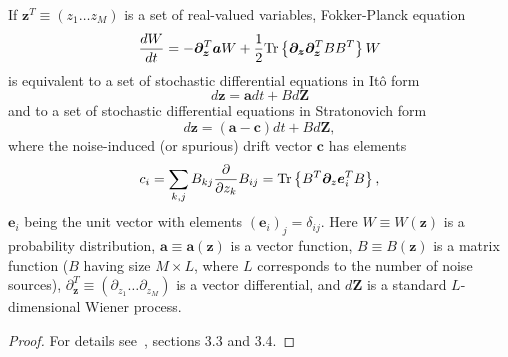 \begin{lemma}
\label{lmm:wigner-bec:fpe:fpe-sde-correspondence}
If $\bm{z}^T \equiv (z_1 \ldots z_M)$ is a set of real-valued variables,
Fokker-Planck equation
\[
	\frac{dW}{dt}
	= -\bm{\partial}_{\bm{z}}^T \bm{a} W
	+ \frac{1}{2} \mathrm{Tr} \left\{  \bm{\partial}_{\bm{z}} \bm{\partial}_{\bm{z}}^T B B^T  \right\} W
\]
is equivalent to a set of stochastic differential equations in It\^{o} form
\[
	d\bm{z} = \bm{a} dt + B d\bm{Z}
\]
and to a set of stochastic differential equations in Stratonovich form
\[
	d\bm{z} = (\bm{a} - \bm{c})dt + B d\bm{Z},
\]
where the noise-induced (or spurious) drift vector $\bm{c}$ has elements
\[
	c_i
	= \sum_{k,j} B_{kj} \frac{\partial}{\partial z_k} B_{ij}
	= \mathrm{Tr} \left\{ B^T \bm{\partial}_z \bm{e}_i^T B \right\},
\]
$\bm{e}_i$ being the unit vector with elements $(\bm{e}_i)_j = \delta_{ij}$.
Here $W \equiv W(\bm{z})$ is a probability distribution,
$\bm{a} \equiv \bm{a}(\bm{z})$ is a vector function,
$B \equiv B(\bm{z})$ is a matrix function ($B$ having size $M \times L$, where $L$ corresponds to the number of noise sources),
$\partial_{\bm{z}}^T \equiv (\partial_{z_1} \ldots \partial_{z_M})$ is a vector differential,
and $d\bm{Z}$ is a standard $L$-dimensional Wiener process.
\end{lemma}
\begin{proof}
For details see~\cite{Risken1996}, sections 3.3 and 3.4.
\end{proof}


